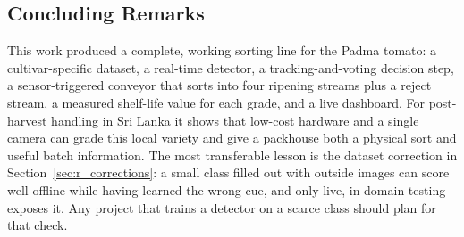 \subsection{Concluding Remarks}
\label{sec:c_closing}

This work produced a complete, working sorting line for the Padma tomato: a cultivar-specific dataset, a real-time detector, a tracking-and-voting decision step, a sensor-triggered conveyor that sorts into four ripening streams plus a reject stream, a measured shelf-life value for each grade, and a live dashboard. For post-harvest handling in Sri Lanka it shows that low-cost hardware and a single camera can grade this local variety and give a packhouse both a physical sort and useful batch information. The most transferable lesson is the dataset correction in Section~\ref{sec:r_corrections}: a small class filled out with outside images can score well offline while having learned the wrong cue, and only live, in-domain testing exposes it. Any project that trains a detector on a scarce class should plan for that check.

\clearpage
